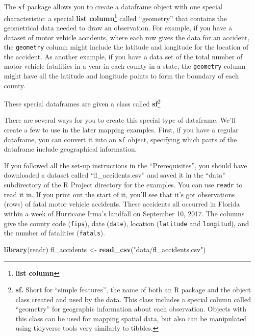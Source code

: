\documentclass[]{tufte-book}
\newenvironment{Shaded}{}{}
\newcommand{\KeywordTok}[1]{\textcolor[rgb]{0.00,0.44,0.13}{\textbf{#1}}}
\newcommand{\NormalTok}[1]{#1}
\newcommand{\StringTok}[1]{\textcolor[rgb]{0.25,0.44,0.63}{#1}}
\begin{document}
The \texttt{sf} package allows you to create a dataframe object with one special characteristic: a
special \textbf{list column}\footnote{\textbf{list column}}
called ``geometry'' that contains the geometrical data needed to draw
an observation. For example, if you have a dataset of motor vehicle accidents, where each
row gives the data for an accident, the \texttt{geometry} column might include the latitude and
longitude for the location of the accident. As another example, if you have a data set of
the total number of motor vehicle fatalities in a year in each county in a state, the
\texttt{geometry} column might have all the latitude and longitude points to form the
boundary of each county.

These special dataframes are given a class called \textbf{sf}\footnote{\textbf{sf.} Short for ``simple features'',
  the name of both an R package and the object class created and used by the data. This class
  includes a special column called ``geometry'' for geographic information about each observation.
  Objects with this class can be used for mapping spatial data, but also can be manipulated
  using tidyverse tools very similarly to tibbles.}

There are several ways for you to create this special type of dataframe. We'll create a few
to use in the later mapping examples. First, if you have a regular dataframe, you can
convert it into an \texttt{sf} object, specifying which parts of the dataframe include geographical
information.

If you followed all the set-up instructions in the ``Prerequisites'', you should have downloaded a
dataset called ``fl\_accidents.csv'' and saved it in the ``data'' subdirectory of the R Project directory
for the examples. You can use \texttt{readr} to read it in. If you print out the start of it, you'll see
that it's got observations (rows) of fatal motor vehicle accidents. These accidents all occurred in
Florida within a week of Hurricane Irma's landfall on September 10, 2017. The columns give
the county code (\texttt{fips}), date (\texttt{date}), location (\texttt{latitude} and \texttt{longitud}), and the number of
fatalities (\texttt{fatals}).

\begin{Shaded}
\begin{Highlighting}[]
\KeywordTok{library}\NormalTok{(readr)}
\NormalTok{fl_accidents <-}\StringTok{ }\KeywordTok{read_csv}\NormalTok{(}\StringTok{"data/fl_accidents.csv"}\NormalTok{)}
\end{Highlighting}
\end{Shaded}
\end{document}
